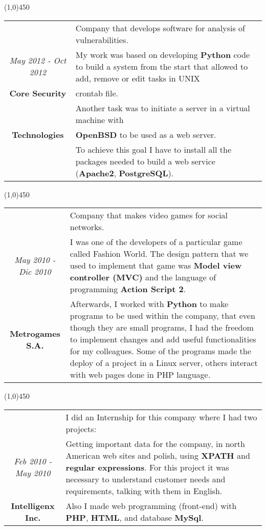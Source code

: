 \begin{center}
\line(1,0){450}
\end{center}

\begin{tabular}{c|p{12.5cm}}
& \large Company that develops software for analysis of vulnerabilities.\\
\large\textit{May 2012 - Oct 2012} &  \large My work was based on developing \textbf{Python} code to build a system from the start that allowed to add, remove or edit tasks in UNIX\\
\large\textbf{Core Security} & \large  crontab file.\\
 & \large  Another task was to initiate a server in a virtual machine with \\
\large\textbf{Technologies} & \large\textbf{OpenBSD} to be used as a web server. \\
& \large To achieve this goal I have to install all the packages needed to build a web service (\textbf{Apache2}, \textbf{PostgreSQL}). \\
\end{tabular}

\begin{center}
\line(1,0){450}
\end{center}
\noindent

\begin{tabular}{c|p{12.5cm}}
& \large Company that makes video games for social networks. \\
\large\textit{May 2010 - Dic 2010} &  \large I was one of the developers of a particular game called Fashion World. The design pattern that we used to implement that game was \textbf{Model view controller (MVC)} and the language of programming \textbf{Action Script 2}.\\
\large\textbf{Metrogames S.A.} & \large Afterwards, I worked with \textbf{Python} to make programs to be used within the company, that even though they are small programs, I had the freedom to implement changes and add useful functionalities for my colleagues. Some of the programs made the deploy of a project in a Linux server, others interact with web pages done in PHP language.
\end{tabular}

\begin{center}
\line(1,0){450}
\end{center}
\noindent
\begin{tabular}{c|p{12.5cm}}
& \large I did an Internship for this company where I had two projects:\\
\large\textit{Feb 2010 - May 2010} & \large Getting important data for the company, in north American web sites and polish, using \textbf{XPATH} and \textbf{regular expressions}.  For this project it was necessary to understand customer needs and requirements, talking with them in English.\\
\large\textbf{Intelligenx Inc.} & \large Also I made web programming (front-end) with \textbf{PHP}, \textbf{HTML}, and database \textbf{MySql}.
\end{tabular}

